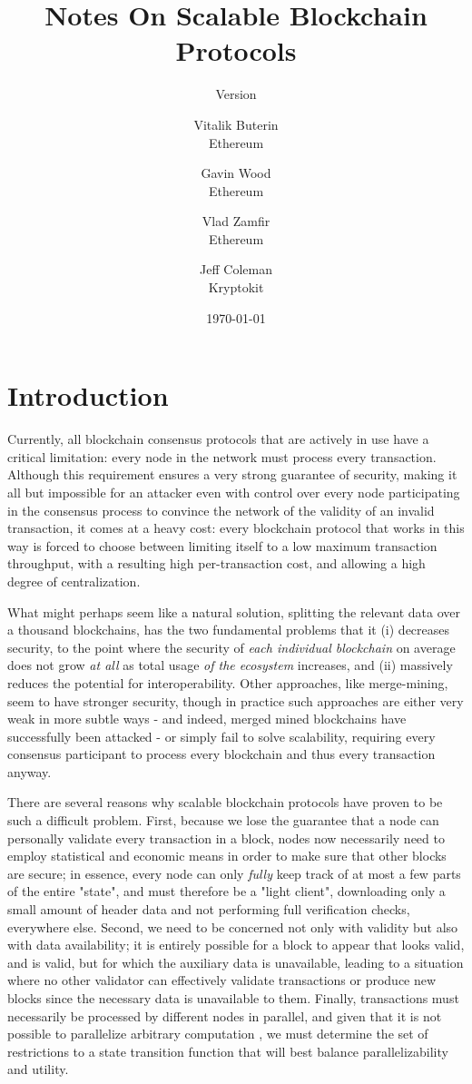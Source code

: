 \documentclass[11pt,a4paper]{report}
\title{Notes On Scalable Blockchain Protocols}
\subtitle{Version }
\author{Vitalik Buterin \\ Ethereum \and Gavin Wood \\ Ethereum \and Vlad Zamfir  \\ Ethereum \and Jeff Coleman \\ Kryptokit}
\date{\today}
\theoremstyle{plain}
\theoremstyle{definition}
\theoremstyle{remark}
\begin{document}
\maketitle

\pagebreak
\tableofcontents
\pagebreak

\chapter{Introduction}

Currently, all blockchain consensus protocols that are actively in use have a critical limitation: every node in the network must process every transaction. Although this requirement ensures a very strong guarantee of security, making it all but impossible for an attacker even with control over every node participating in the consensus process to convince the network of the validity of an invalid transaction, it comes at a heavy cost: every blockchain protocol that works in this way is forced to choose between limiting itself to a low maximum transaction throughput, with a resulting high per-transaction cost, and allowing a high degree of centralization.

What might perhaps seem like a natural solution, splitting the relevant data over a thousand blockchains, has the two fundamental problems that it (i) decreases security, to the point where the security of \emph{each individual blockchain} on average does not grow \emph{at all} as total usage \emph{of the ecosystem} increases, and (ii) massively reduces the potential for interoperability. Other approaches, like merge-mining, seem to have stronger security, though in practice such approaches are either very weak in more subtle ways \citep{todd_re:_2013} - and indeed, merged mined blockchains have successfully been attacked\citep{piasecki_what_2012} - or simply fail to solve scalability, requiring every consensus participant to process every blockchain and thus every transaction anyway.

There are several reasons why scalable blockchain protocols have proven to be such a difficult problem. First, because we lose the guarantee that a node can personally validate every transaction in a block, nodes now necessarily need to employ statistical and economic means in order to make sure that other blocks are secure; in essence, every node can only \emph{fully} keep track of at most a few parts of the entire "state", and must therefore be a "light client", downloading only a small amount of header data and not performing full verification checks, everywhere else. Second, we need to be concerned not only with validity but also with data availability; it is entirely possible for a block to appear that looks valid, and is valid, but for which the auxiliary data is unavailable, leading to a situation where no other validator can effectively validate transactions or produce new blocks since the necessary data is unavailable to them. Finally, transactions must necessarily be processed by different nodes in parallel, and given that it is not possible to parallelize arbitrary computation \citep{amdahl_validity_1967,gustafson_reevaluating_1988}, we must determine the set of restrictions to a state transition function that will best balance parallelizability and utility.
\end{document}

